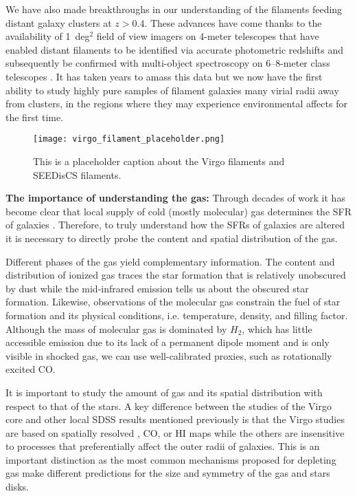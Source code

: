 \documentclass[11pt]{article}
\begin{document}
We have also made breakthroughs in our understanding of the filaments feeding distant galaxy clusters at $z>0.4$.  These advances have come thanks to the availability of 1~deg$^{2}$ field of view imagers on 4-meter telescopes that have enabled distant filaments to be identified via accurate photometric redshifts and subsequently be confirmed with multi-object spectroscopy on 6--8-meter class telescopes \citep[Fig. 1;][]{Rerat17}.  It has taken years to amass this data but we now have the first ability to study highly pure samples of filament galaxies many virial radii away from clusters, in the regions where they may experience environmental affects for the first time.

\begin{figure}
\texttt{[image: virgo\_filament\_placeholder.png]}
\caption{This is a placeholder caption about the Virgo filaments and SEEDisCS filaments.}
\end{figure}

\textbf{The importance of understanding the gas:} Through decades of
work it has become clear that local supply of cold (mostly molecular)
gas determines the SFR of galaxies
\citep{Kennicutt98b,Bigiel08,Leroy08}. Therefore, to truly understand
how the SFRs of galaxies are altered it is necessary to directly probe
the content and spatial distribution of the gas.

Different phases of the gas yield complementary information.  The
content and distribution of ionized gas traces the star formation that
is relatively unobscured by dust while the mid-infrared emission tells
us about the obscured star formation.  Likewise, observations of the
molecular gas constrain the fuel of star formation and its physical
conditions, i.e. temperature, density, and filling factor.  Although
the mass of molecular gas is dominated by $H_2$, which has little
accessible emission due to its lack of a permanent dipole moment and is only visible in shocked gas, we
can use well-calibrated proxies, such as rotationally excited CO.

It is important to study the amount of gas and its spatial
distribution with respect to that of the stars.  A key difference
between the studies of the Virgo core and other local SDSS results mentioned previously is that the
Virgo studies are based on spatially resolved \ha, CO, or HI maps while
the others are insensitive to processes that preferentially affect the
outer radii of galaxies.  This is an important distinction as the most
common mechanisms proposed for depleting gas make different
predictions for the size and symmetry of the gas and stars disks.
\end{document}
